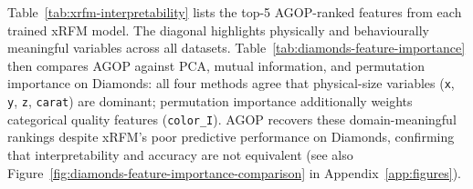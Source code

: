 Table~\ref{tab:xrfm-interpretability} lists the top-5 AGOP-ranked features from each trained xRFM
model. The diagonal highlights physically and behaviourally meaningful variables across all datasets.
Table~\ref{tab:diamonds-feature-importance} then compares AGOP against PCA, mutual information, and
permutation importance on Diamonds: all four methods agree that physical-size variables
(\texttt{x}, \texttt{y}, \texttt{z}, \texttt{carat}) are dominant; permutation importance additionally
weights categorical quality features (\texttt{color\_I}).
AGOP recovers these domain-meaningful rankings despite xRFM's poor predictive performance on Diamonds,
confirming that interpretability and accuracy are not equivalent
(see also Figure~\ref{fig:diamonds-feature-importance-comparison} in Appendix~\ref{app:figures}).

\begin{table}[H]
  \centering
  \caption{Top-5 AGOP-diagonal feature rankings from trained xRFM models.}
  \label{tab:xrfm-interpretability}
\end{table}

